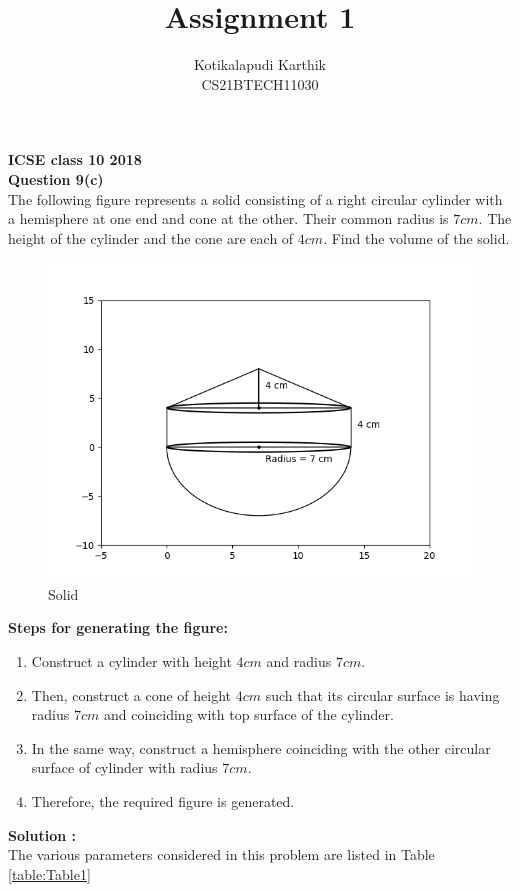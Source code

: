 \documentclass[journal,12pt,twocolumn]{IEEEtran}
\title{Assignment 1}
\author{Kotikalapudi Karthik \\
CS21BTECH11030}
\begin{document}
\maketitle

\textbf{ICSE class 10 2018}\\
\textbf{Question 9(c)}\\
The following figure represents a solid consisting of a right circular cylinder with a hemisphere at one end and cone at the other. Their common radius is $7cm$. The height of the cylinder and the cone are each of $4cm$. Find the volume of the solid.\\
\begin{figure}[ht!]
	  \centering 
	  \includegraphics[width=\columnwidth]{Figs/Diagram.png}
	  \caption{Solid}
\end{figure}

\textbf{Steps for generating the figure:}
\begin{enumerate}
    \item Construct a cylinder with height $4cm$ and radius $7cm$.
    \item Then, construct a cone of height $4cm$ such that its circular surface is having radius $7cm$ and coinciding with top surface of the cylinder.
    \item In the same way, construct a hemisphere coinciding with the other circular surface of cylinder with radius $7cm$.
    \item Therefore, the required figure is generated.
\end{enumerate}
\textbf{Solution :}\\
The various parameters considered in this problem are listed in Table
\eqref{table:Table1}
\\
\begin{table}[ht!]
    \centering
    
    \caption{}
    \label{table:Table1}
\end{table}
\end{document}
